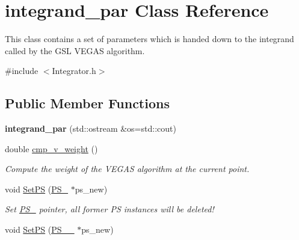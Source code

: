\hypertarget{classintegrand__par}{}\section{integrand\+\_\+par Class Reference}
\label{classintegrand__par}


This class contains a set of parameters which is handed down to the integrand called by the G\+S\+L V\+E\+G\+A\+S algorithm.  




{\ttfamily \#include $<$Integrator.\+h$>$}

\subsection*{Public Member Functions}
\begin{DoxyCompactItemize}
\item 
\hypertarget{classintegrand__par_a91beb4d7cdba03603a3d95d46ee0621f}{}{\bfseries integrand\+\_\+par} (std\+::ostream \&os=std\+::cout)\label{classintegrand__par_a91beb4d7cdba03603a3d95d46ee0621f}

\item 
\hypertarget{classintegrand__par_aac7bdde6abcb8d81db5af3a24ce51f7d}{}double \hyperlink{classintegrand__par_aac7bdde6abcb8d81db5af3a24ce51f7d}{cmp\+\_\+v\+\_\+weight} ()\label{classintegrand__par_aac7bdde6abcb8d81db5af3a24ce51f7d}

\begin{DoxyCompactList}\small\item\em Compute the weight of the V\+E\+G\+A\+S algorithm at the current point. \end{DoxyCompactList}\item 
\hypertarget{classintegrand__par_ac812da01c993e943a14b263c58340c06}{}void \hyperlink{classintegrand__par_ac812da01c993e943a14b263c58340c06}{Set\+P\+S} (\hyperlink{classPS__2}{P\+S\+\_} $\ast$ps\+\_\+new)\label{classintegrand__par_ac812da01c993e943a14b263c58340c06}

\begin{DoxyCompactList}\small\item\em Set \hyperlink{classPS__2}{P\+S\+\_} pointer, all former P\+S instances will be deleted! \end{DoxyCompactList}\item 
\hypertarget{classintegrand__par_ae6a0f7921042073a8ac6328794561299}{}void \hyperlink{classintegrand__par_ae6a0f7921042073a8ac6328794561299}{Set\+P\+S} (\hyperlink{classPS__2__2}{P\+S\+\_\+\_} $\ast$ps\+\_\+new)\label{classintegrand__par_ae6a0f7921042073a8ac6328794561299}


\end{DoxyCompactItemize}
